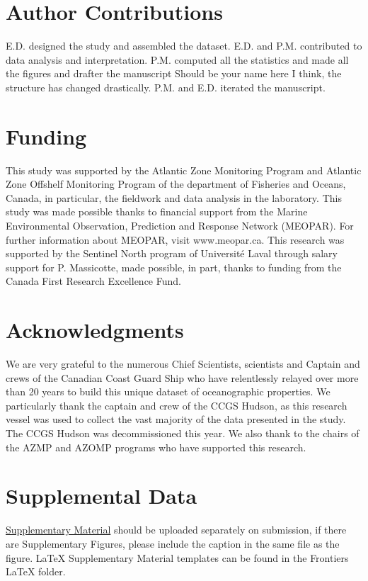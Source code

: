 \documentclass[utf8]{frontiersSCNS} %
\begin{document}
\section*{Author Contributions}

E.D. designed the study and assembled the dataset. E.D. and P.M. contributed to data analysis and interpretation. P.M. computed all the statistics and made all the figures and drafter the manuscript Should be your name here I think, the structure has changed drastically. P.M. and E.D. iterated the manuscript. 

\section*{Funding}
This study was supported by the Atlantic Zone Monitoring Program and Atlantic Zone Offshelf Monitoring Program of the department of Fisheries and Oceans, Canada, in particular, the fieldwork and data analysis in the laboratory.  This study was made possible thanks to financial support from the Marine Environmental Observation, Prediction and Response Network (MEOPAR). For further information about MEOPAR, visit www.meopar.ca. This research was supported by the Sentinel North program of Université Laval through salary support for P. Massicotte, made possible, in part, thanks to funding from the Canada First Research Excellence Fund.

\section*{Acknowledgments}
We are very grateful to the numerous Chief Scientists, scientists and Captain and crews of the Canadian Coast Guard Ship who have relentlessly relayed over more than 20 years to build this unique dataset of oceanographic properties. We particularly thank the captain and crew of the CCGS Hudson, as this research vessel was used to collect the vast majority of the data presented in the study. The CCGS Hudson was decommissioned this year. We also thank to the chairs of the AZMP and AZOMP programs who have supported this research. 

\section*{Supplemental Data}
 \href{http://home.frontiersin.org/about/author-guidelines#SupplementaryMaterial}{Supplementary Material} should be uploaded separately on submission, if there are Supplementary Figures, please include the caption in the same file as the figure. LaTeX Supplementary Material templates can be found in the Frontiers LaTeX folder.
\end{document}
